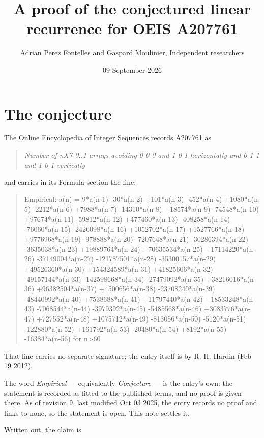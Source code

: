 \documentclass[11pt]{article}
\title{A proof of the conjectured linear recurrence for OEIS A207761}
\author{Adrian Perez Fontelles and Gaspard Moulinier, Independent researchers}
\date{09 September 2026}
\theoremstyle{definition}
\begin{document}
\maketitle
\section{The conjecture}

The Online Encyclopedia of Integer Sequences records \href{https://oeis.org/A207761}{A207761} as

\begin{quote}\itshape Number of nX7 0..1 arrays avoiding 0 0 0 and 1 0 1 horizontally and 0 1 1 and 1 0 1 vertically\end{quote}

and carries in its Formula section the line:

\begin{quote}\ttfamily Empirical: a(n) = 9*a(n-1) -30*a(n-2) +101*a(n-3) -452*a(n-4) +1080*a(n-5) -2212*a(n-6) +7988*a(n-7) -14310*a(n-8) +18574*a(n-9) -74548*a(n-10) +97674*a(n-11) -59812*a(n-12) +477460*a(n-13) -408258*a(n-14) -76060*a(n-15) -2426098*a(n-16) +1052702*a(n-17) +1527766*a(n-18) +9776968*a(n-19) -978888*a(n-20) -7207648*a(n-21) -30286394*a(n-22) -3635038*a(n-23) +19889764*a(n-24) +70635534*a(n-25) +17114220*a(n-26) -37149004*a(n-27) -121787501*a(n-28) -35300157*a(n-29) +49526360*a(n-30) +154324589*a(n-31) +41825606*a(n-32) -49157144*a(n-33) -142598668*a(n-34) -27479092*a(n-35) +38216016*a(n-36) +96382504*a(n-37) +4500656*a(n-38) -23708240*a(n-39) -48440992*a(n-40) +7538688*a(n-41) +11797440*a(n-42) +18533248*a(n-43) -7068544*a(n-44) -3979392*a(n-45) -5485568*a(n-46) +3083776*a(n-47) +727552*a(n-48) +1075712*a(n-49) -813056*a(n-50) -5120*a(n-51) -122880*a(n-52) +161792*a(n-53) -20480*a(n-54) +8192*a(n-55) -16384*a(n-56) for n>60\end{quote}

That line carries no separate signature; the entry itself is by R. H. Hardin (Feb 19 2012).

The word {\itshape Empirical} --- equivalently {\itshape Conjecture} --- is the entry's own: the statement is recorded as fitted to the published terms, and no proof is given there. As of revision 9, last modified Oct 03 2025, the entry records no proof and links to none, so the statement is open. This note settles it.

Written out, the claim is
\end{document}
